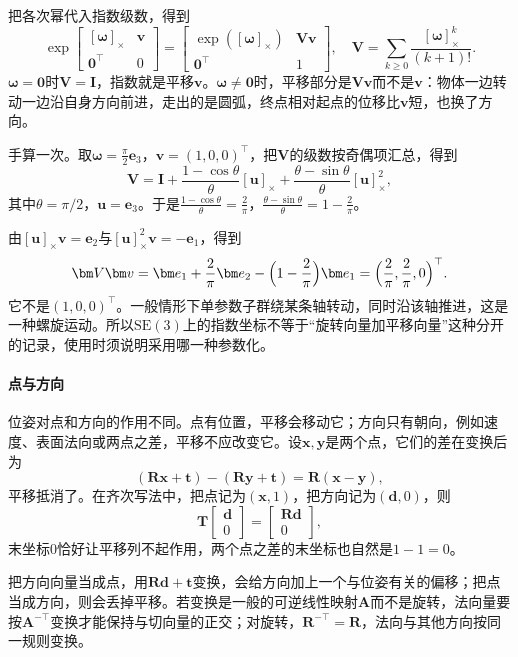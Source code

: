 把各次幂代入指数级数，得到
\begin{equation}
 \exp\begin{bmatrix}[\bm\omega]_\times&\bm v\\\bm0^\top&0\end{bmatrix}
 =\begin{bmatrix}\exp([\bm\omega]_\times)&\bm V\bm v\\\bm0^\top&1\end{bmatrix},\quad
 \bm V=\sum_{k\geq0}\frac{[\bm\omega]_\times^k}{(k+1)!}.
 \label{eq:lie-se3-exp}
\end{equation}
$\bm\omega=\bm0$时$\bm V=\bm I$，指数就是平移$\bm v$。$\bm\omega\neq\bm0$时，平移部分是$\bm V\bm v$而不是$\bm v$：物体一边转动一边沿自身方向前进，走出的是圆弧，终点相对起点的位移比$\bm v$短，也换了方向。

手算一次。取$\bm\omega=\frac\pi2\bm e_3$，$\bm v=(1,0,0)^\top$，把$\bm V$的级数按奇偶项汇总，得到
\[
\bm V=\bm I+\frac{1-\cos\theta}{\theta}[\bm u]_\times+\frac{\theta-\sin\theta}{\theta}[\bm u]_\times^2,
\]
其中$\theta=\pi/2$，$\bm u=\bm e_3$。于是$\frac{1-\cos\theta}{\theta}=\frac2\pi$，$\frac{\theta-\sin\theta}{\theta}=1-\frac2\pi$。

由$[\bm u]_\times\bm v=\bm e_2$与$[\bm u]_\times^2\bm v=-\bm e_1$，得到
\[
\bm V\bm v=\bm e_1+\frac2\pi\bm e_2-\Bigl(1-\frac2\pi\Bigr)\bm e_1
=\Bigl(\frac2\pi,\frac2\pi,0\Bigr)^\top.
\]
它不是$(1,0,0)^\top$。一般情形下单参数子群绕某条轴转动，同时沿该轴推进，这是一种螺旋运动。所以$\mathrm{SE}(3)$上的指数坐标不等于“旋转向量加平移向量”这种分开的记录，使用时须说明采用哪一种参数化。

\paragraph{点与方向}
位姿对点和方向的作用不同。点有位置，平移会移动它；方向只有朝向，例如速度、表面法向或两点之差，平移不应改变它。设$\bm x,\bm y$是两个点，它们的差在变换后为
\[
(\bm R\bm x+\bm t)-(\bm R\bm y+\bm t)=\bm R(\bm x-\bm y),
\]
平移抵消了。在齐次写法中，把点记为$(\bm x,1)$，把方向记为$(\bm d,0)$，则
\[
\bm T\begin{bmatrix}\bm d\\0\end{bmatrix}=\begin{bmatrix}\bm R\bm d\\0\end{bmatrix},
\]
末坐标$0$恰好让平移列不起作用，两个点之差的末坐标也自然是$1-1=0$。

把方向向量当成点，用$\bm R\bm d+\bm t$变换，会给方向加上一个与位姿有关的偏移；把点当成方向，则会丢掉平移。若变换是一般的可逆线性映射$\bm A$而不是旋转，法向量要按$\bm A^{-\top}$变换才能保持与切向量的正交；对旋转，$\bm R^{-\top}=\bm R$，法向与其他方向按同一规则变换。

